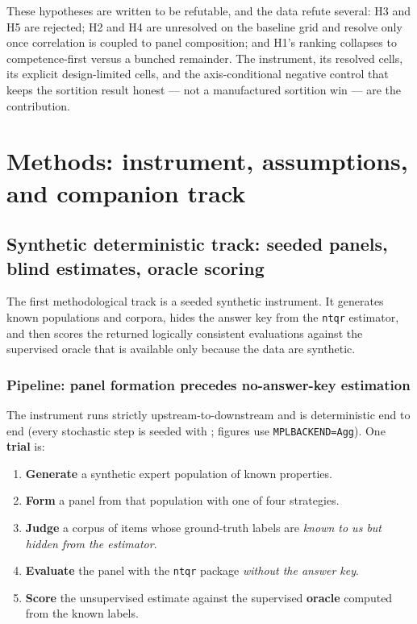 \documentclass[
]{article}
\providecommand{\tightlist}{%
  \setlength{\itemsep}{0pt}\setlength{\parskip}{0pt}}
\begin{document}
These hypotheses are written to be refutable, and the data refute
several: H3 and H5 are rejected; H2 and H4 are unresolved on the
baseline grid and resolve only once correlation is coupled to panel
composition; and H1's ranking collapses to competence-first versus a
bunched remainder. The instrument, its resolved cells, its explicit
design-limited cells, and the axis-conditional negative control that
keeps the sortition result honest --- not a manufactured sortition win
--- are the contribution.

\newpage

\section{Methods: instrument, assumptions, and companion
track}\label{methods-instrument-assumptions-and-companion-track}

\subsection{Synthetic deterministic track: seeded panels, blind
estimates, oracle
scoring}\label{synthetic-deterministic-track-seeded-panels-blind-estimates-oracle-scoring}

The first methodological track is a seeded synthetic instrument. It
generates known populations and corpora, hides the answer key from the
\texttt{ntqr} estimator, and then scores the returned logically
consistent evaluations against the supervised oracle that is available
only because the data are synthetic.

\subsubsection{Pipeline: panel formation precedes no-answer-key
estimation}\label{pipeline-panel-formation-precedes-no-answer-key-estimation}

The instrument runs strictly upstream-to-downstream and is deterministic
end to end (every stochastic step is seeded with
; figures use
\texttt{MPLBACKEND=Agg}). One \textbf{trial} is:

\begin{enumerate}
\def\labelenumi{\arabic{enumi}.}
\tightlist
\item
  \textbf{Generate} a synthetic expert population of known properties.
\item
  \textbf{Form} a panel from that population with one of four
  strategies.
\item
  \textbf{Judge} a corpus of items whose ground-truth labels are
  \emph{known to us but hidden from the estimator}.
\item
  \textbf{Evaluate} the panel with the \texttt{ntqr} package
  \emph{without the answer key}.
\item
  \textbf{Score} the unsupervised estimate against the supervised
  \textbf{oracle} computed from the known labels.
\end{enumerate}
\end{document}
